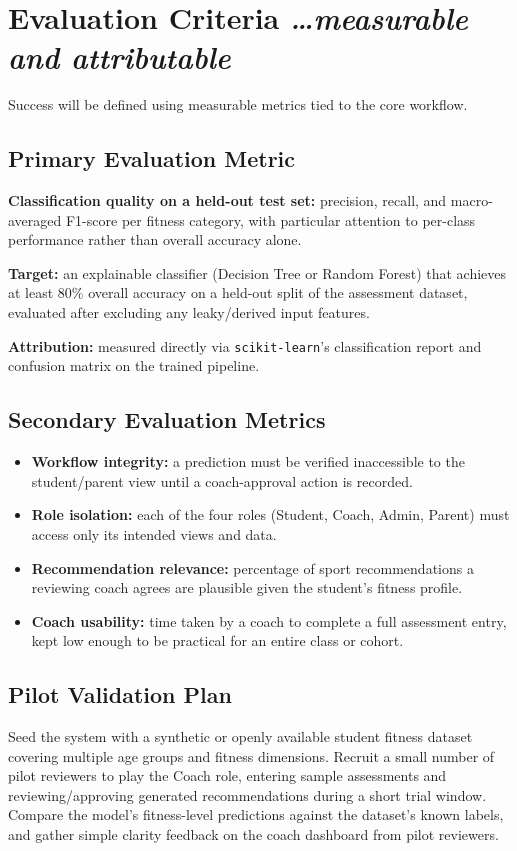 \documentclass[11pt,a4paper]{article}
\newcommand{\BvrHint}[1]{%
  {\normalfont\normalsize\itshape\hfill #1}}
\begin{document}
\section{Evaluation Criteria %
\BvrHint{\ldots measurable and attributable}}
Success will be defined using measurable metrics tied to
the core workflow.

\subsection{Primary Evaluation Metric}
\textbf{Classification quality on a held-out test set:}
precision, recall, and macro-averaged F1-score per fitness
category, with particular attention to per-class
performance rather than overall accuracy alone.

\textbf{Target:} an explainable classifier (Decision Tree
or Random Forest) that achieves at least 80\% overall
accuracy on a held-out split of the assessment dataset,
evaluated after excluding any leaky/derived input features.

\textbf{Attribution:} measured directly via
\texttt{scikit-learn}'s classification report and confusion
matrix on the trained pipeline.

\subsection{Secondary Evaluation Metrics}
\begin{itemize}[leftmargin=0.7cm]
    \item \textbf{Workflow integrity:} a prediction must be verified inaccessible to the student/parent view until a coach-approval action is recorded.
    \item \textbf{Role isolation:} each of the four roles (Student, Coach, Admin, Parent) must access only its intended views and data.
    \item \textbf{Recommendation relevance:} percentage of sport recommendations a reviewing coach agrees are plausible given the student's fitness profile.
    \item \textbf{Coach usability:} time taken by a coach to complete a full assessment entry, kept low enough to be practical for an entire class or cohort.
\end{itemize}

\subsection{Pilot Validation Plan}
Seed the system with a synthetic or openly available
student fitness dataset covering multiple age groups and
fitness dimensions. Recruit a small number of pilot
reviewers to play the Coach role, entering sample
assessments and reviewing/approving generated
recommendations during a short trial window. Compare the
model's fitness-level predictions against the dataset's
known labels, and gather simple clarity feedback on the
coach dashboard from pilot reviewers.
\end{document}
